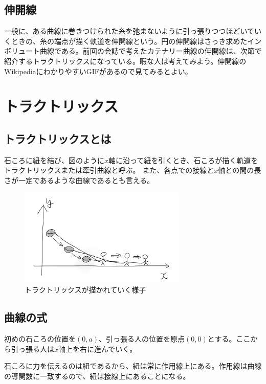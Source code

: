 \subsection{伸開線}
  一般に、ある曲線に巻きつけられた糸を弛まないように引っ張りつつほどいていくときの、糸の端点が描く軌道を伸開線という。円の伸開線はさっき求めたインボリュート曲線である。前回の会誌で考えたカテナリー曲線の伸開線は、次節で紹介するトラクトリックスになっている。暇な人は考えてみよう。伸開線のWikipediaにわかりやすいGIFがあるので見てみるとよい。


\section{トラクトリックス}

\subsection{トラクトリックスとは}
石ころに紐を結び、図のように$x$軸に沿って紐を引くとき、石ころが描く軌道をトラクトリックスまたは牽引曲線と呼ぶ。
また、各点での接線と$x$軸との間の長さが一定であるような曲線であるとも言える。\par
\begin{figure}[H]
  \centering
  \includegraphics[width=8cm]{nakayama1/image/trac1}\\
  {\small トラクトリックスが描かれていく様子}
\end{figure}

\subsection{曲線の式}

初めの石ころの位置を$(0,a)$、引っ張る人の位置を原点$(0,0)$とする。ここから引っ張る人は$x$軸上を右に進んでいく。\par
石ころに力を伝えるのは紐であるから、紐は常に作用線上にある。作用線は曲線の導関数に一致するので、紐は接線上にあることになる。

